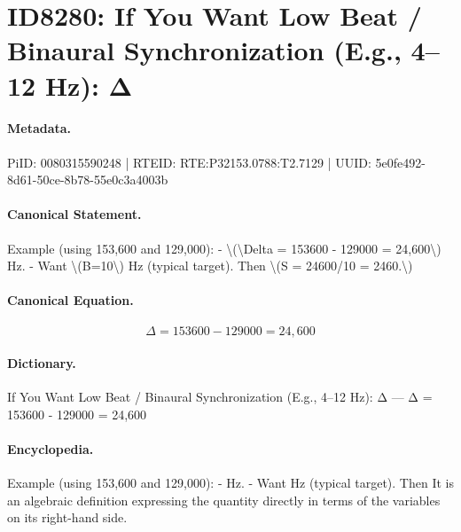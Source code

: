 \section*{ID8280: If You Want Low Beat / Binaural Synchronization (E.g., 4–12 Hz): Δ}
\paragraph{Metadata.}
PiID: 0080315590248 | RTEID: RTE:P32153.0788:T2.7129 | UUID: 5e0fe492-8d61-50ce-8b78-55e0c3a4003b

\paragraph{Canonical Statement.}
Example (using 153,600 and 129,000): - \textbackslash{}(\textbackslash{}Delta = 153600 - 129000 = 24,600\textbackslash{}) Hz. - Want \textbackslash{}(B=10\textbackslash{}) Hz (typical target). Then \textbackslash{}(S = 24600/10 = 2460.\textbackslash{})

\paragraph{Canonical Equation.}
\[
\Delta = 153600 - 129000 = 24,600
\]

\paragraph{Dictionary.}
If You Want Low Beat / Binaural Synchronization (E.g., 4–12 Hz): Δ — Δ = 153600 - 129000 = 24,600

\paragraph{Encyclopedia.}
Example (using 153,600 and 129,000): - Hz. - Want Hz (typical target). Then It is an algebraic definition expressing the quantity directly in terms of the variables on its right-hand side.
